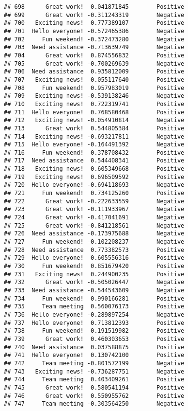 \documentclass[
]{article}
\begin{document}
\begin{verbatim}
## 698      Great work!  0.041871845        Positive
## 699      Great work! -0.311243319        Negative
## 700   Exciting news!  0.777389107        Positive
## 701  Hello everyone! -0.572465386        Negative
## 702     Fun weekend! -0.372473280        Negative
## 703  Need assistance -0.713639749        Negative
## 704      Great work!  0.874556832        Positive
## 705      Great work! -0.700269639        Negative
## 706  Need assistance  0.935812009        Positive
## 707   Exciting news!  0.055117640        Positive
## 708     Fun weekend!  0.957983019        Positive
## 709   Exciting news! -0.539138246        Negative
## 710   Exciting news!  0.722319741        Positive
## 711  Hello everyone!  0.768580468        Positive
## 712   Exciting news! -0.054910814        Negative
## 713      Great work!  0.544805384        Positive
## 714   Exciting news! -0.693217811        Negative
## 715  Hello everyone! -0.164491392        Negative
## 716     Fun weekend!  0.378708432        Positive
## 717  Need assistance  0.544408341        Positive
## 718   Exciting news!  0.605349668        Positive
## 719   Exciting news!  0.696509592        Positive
## 720  Hello everyone! -0.694118693        Negative
## 721     Fun weekend!  0.734125260        Positive
## 722      Great work! -0.222633559        Negative
## 723      Great work! -0.111933967        Negative
## 724      Great work! -0.417041691        Negative
## 725      Great work! -0.841218561        Negative
## 726  Need assistance -0.173975688        Negative
## 727     Fun weekend! -0.102208237        Negative
## 728  Need assistance  0.773382573        Positive
## 729  Hello everyone!  0.605556316        Positive
## 730     Fun weekend!  0.851679420        Positive
## 731   Exciting news!  0.244900235        Positive
## 732      Great work! -0.505026447        Negative
## 733  Need assistance -0.544543609        Negative
## 734     Fun weekend!  0.990166281        Positive
## 735     Team meeting  0.560076173        Positive
## 736  Hello everyone! -0.289897254        Negative
## 737  Hello everyone!  0.713812393        Positive
## 738     Fun weekend!  0.191519982        Positive
## 739      Great work!  0.460303653        Positive
## 740  Need assistance  0.037588875        Positive
## 741  Hello everyone!  0.130742100        Positive
## 742     Team meeting -0.801572199        Negative
## 743   Exciting news! -0.736287751        Negative
## 744     Team meeting  0.403409261        Positive
## 745      Great work!  0.580541194        Positive
## 746      Great work!  0.550955762        Positive
## 747     Team meeting -0.303564250        Negative

\end{verbatim}
\end{document}
